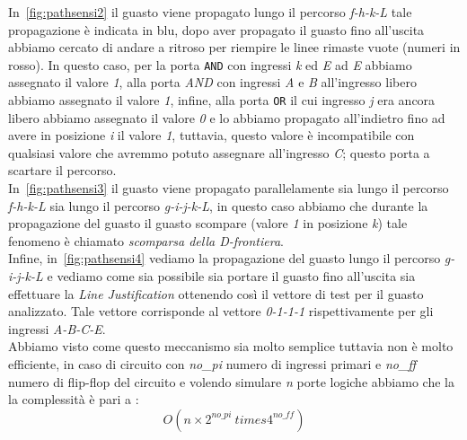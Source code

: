 In \figurename\,\ref{fig:pathsensi2} il guasto viene propagato lungo il percorso \emph{f-h-k-L} tale propagazione è indicata in blu, dopo aver propagato il guasto fino all'uscita abbiamo cercato di andare a ritroso per riempire le linee rimaste vuote (numeri in rosso). In questo caso, per la porta \texttt{AND} con ingressi \emph{k} ed \emph{E} ad \emph{E} abbiamo assegnato il valore \emph{1}, alla porta \emph{AND} con ingressi \emph{A} e \emph{B} all'ingresso libero abbiamo assegnato il valore \emph{1}, infine, alla porta \texttt{OR} il cui ingresso \emph{j} era ancora libero abbiamo assegnato il valore \emph{0} e lo abbiamo propagato all'indietro fino ad avere in posizione \emph{i} il valore \emph{1}, tuttavia, questo valore è incompatibile con qualsiasi valore che avremmo potuto assegnare all'ingresso \emph{C}; questo porta a scartare il percorso.\\
In \figurename\,\ref{fig:pathsensi3} il guasto viene propagato parallelamente sia lungo il percorso \emph{f-h-k-L} sia lungo il percorso \emph{g-i-j-k-L}, in questo caso abbiamo che durante la propagazione del guasto il guasto scompare (valore \emph{1} in posizione \emph{k}) tale fenomeno è chiamato \emph{scomparsa della D-frontiera}.\\
Infine, in \figurename\,\ref{fig:pathsensi4} vediamo la propagazione del guasto lungo il percorso \emph{g-i-j-k-L} e vediamo come sia possibile sia portare il guasto fino all'uscita sia effettuare la \emph{Line Justification} ottenendo così il vettore di test per il guasto analizzato. Tale vettore corrisponde al vettore \emph{0-1-1-1} rispettivamente per gli ingressi \emph{A-B-C-E}.\\
Abbiamo visto come questo meccanismo sia molto semplice tuttavia non è molto efficiente, in caso di circuito con \emph{no\_pi} numero di ingressi primari e \emph{no\_ff} numero di flip-flop del circuito e volendo simulare \emph{n} porte logiche abbiamo che la la complessità è pari a :
$$O(n \times 2^{no\_pi} \ times 4^{no\_ff})$$
\newpage
